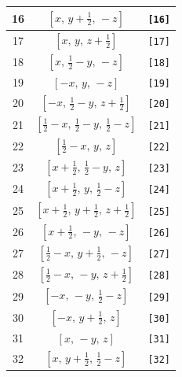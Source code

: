 \documentclass[fleqn,8pt]{jsarticle}
\begin{document}
\begin{longtable}{ccc}
16 & $\left[ x,\, y + \frac{1}{2},\, - z \right]$ & {\tt [16]} \\ \hline
17 & $\left[ x,\, y,\, z + \frac{1}{2} \right]$ & {\tt [17]} \\ \hline
18 & $\left[ x,\, \frac{1}{2} - y,\, - z \right]$ & {\tt [18]} \\ \hline
19 & $\left[ - x,\, y,\, - z \right]$ & {\tt [19]} \\ \hline
20 & $\left[ - x,\, \frac{1}{2} - y,\, z + \frac{1}{2} \right]$ & {\tt [20]} \\ \hline
21 & $\left[ \frac{1}{2} - x,\, \frac{1}{2} - y,\, \frac{1}{2} - z \right]$ & {\tt [21]} \\ \hline
22 & $\left[ \frac{1}{2} - x,\, y,\, z \right]$ & {\tt [22]} \\ \hline
23 & $\left[ x + \frac{1}{2},\, \frac{1}{2} - y,\, z \right]$ & {\tt [23]} \\ \hline
24 & $\left[ x + \frac{1}{2},\, y,\, \frac{1}{2} - z \right]$ & {\tt [24]} \\ \hline
25 & $\left[ x + \frac{1}{2},\, y + \frac{1}{2},\, z + \frac{1}{2} \right]$ & {\tt [25]} \\ \hline
26 & $\left[ x + \frac{1}{2},\, - y,\, - z \right]$ & {\tt [26]} \\ \hline
27 & $\left[ \frac{1}{2} - x,\, y + \frac{1}{2},\, - z \right]$ & {\tt [27]} \\ \hline
28 & $\left[ \frac{1}{2} - x,\, - y,\, z + \frac{1}{2} \right]$ & {\tt [28]} \\ \hline
29 & $\left[ - x,\, - y,\, \frac{1}{2} - z \right]$ & {\tt [29]} \\ \hline
30 & $\left[ - x,\, y + \frac{1}{2},\, z \right]$ & {\tt [30]} \\ \hline
31 & $\left[ x,\, - y,\, z \right]$ & {\tt [31]} \\ \hline
32 & $\left[ x,\, y + \frac{1}{2},\, \frac{1}{2} - z \right]$ & {\tt [32]} \\
\end{longtable}
\end{document}
